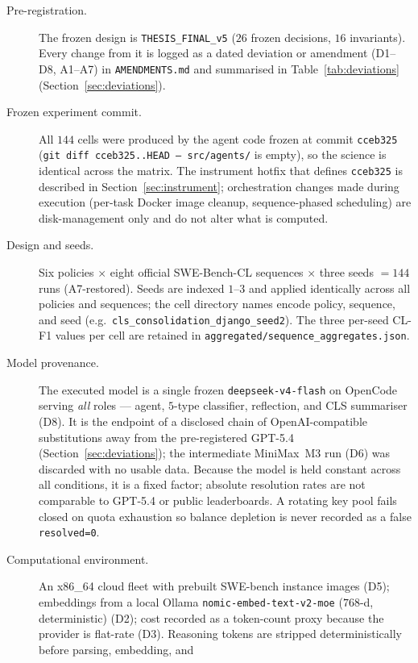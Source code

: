 \begin{description}
  \item[Pre-registration.] The frozen design is \texttt{THESIS\_FINAL\_v5} ($26$ frozen
    decisions, $16$ invariants). Every change from it is logged as a dated deviation or
    amendment (D1--D8, A1--A7) in \texttt{AMENDMENTS.md} and summarised in
    Table~\ref{tab:deviations} (Section~\ref{sec:deviations}).
  \item[Frozen experiment commit.] All $144$ cells were produced by the agent code frozen at
    commit \texttt{cceb325} (\texttt{git diff cceb325..HEAD -- src/agents/} is empty), so the
    science is identical across the matrix. The instrument hotfix that defines \texttt{cceb325}
    is described in Section~\ref{sec:instrument}; orchestration changes made during execution
    (per-task Docker image cleanup, sequence-phased scheduling) are disk-management only and do
    not alter what is computed.
  \item[Design and seeds.] Six policies $\times$ eight official SWE-Bench-CL sequences $\times$
    three seeds $=144$ runs (A7-restored). Seeds are indexed $1$--$3$ and applied identically
    across all policies and sequences; the cell directory names encode policy, sequence, and
    seed (e.g.\ \texttt{cls\_consolidation\_django\_seed2}). The three per-seed CL-F1 values per
    cell are retained in \texttt{aggregated/sequence\_aggregates.json}.
  \item[Model provenance.] The executed model is a single frozen
    \texttt{deepseek-v4-flash} on OpenCode serving \emph{all} roles --- agent, $5$-type
    classifier, reflection, and CLS summariser (D8). It is the endpoint of a disclosed chain of
    OpenAI-compatible substitutions away from the pre-registered GPT-5.4 (Section~\ref{sec:deviations});
    the intermediate MiniMax~M3 run (D6) was discarded with no usable data. Because the model is
    held constant across all conditions, it is a fixed factor; absolute resolution rates are not
    comparable to GPT-5.4 or public leaderboards. A rotating key pool fails closed on quota
    exhaustion so balance depletion is never recorded as a false \texttt{resolved=0}.
  \item[Computational environment.] An x86\_64 cloud fleet with prebuilt SWE-bench instance
    images (D5); embeddings from a local Ollama \texttt{nomic-embed-text-v2-moe} ($768$-d,
    deterministic) (D2); cost recorded as a token-count proxy because the provider is flat-rate
    (D3). Reasoning tokens are stripped deterministically before parsing, embedding, and

\end{description}
